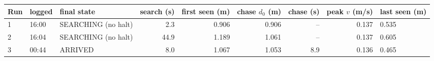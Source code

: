 \begin{tabular}{@{}lllrrrrrl@{}}
\toprule
Run & logged & final state & search (s) & first seen (m) & chase $d_0$ (m) & chase (s) & peak $v$ (m/s) & last seen (m)\\
\midrule
1 & 16:00 & SEARCHING (no halt) & 2.3 & 0.906 & 0.906 & -- & 0.137 & 0.535\\
2 & 16:04 & SEARCHING (no halt) & 44.9 & 1.189 & 1.061 & -- & 0.137 & 0.605\\
3 & 00:44 & ARRIVED & 8.0 & 1.067 & 1.053 & 8.9 & 0.136 & 0.465\\
\bottomrule
\end{tabular}
